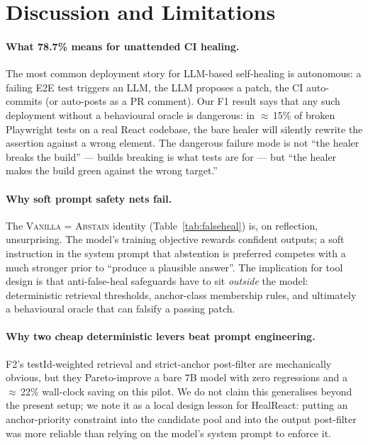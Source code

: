 \section{Discussion and Limitations}
\label{sec:discussion}

\paragraph{What 78.7\% means for unattended CI healing.}
The most common deployment story for LLM-based self-healing is autonomous: a failing E2E test triggers an LLM, the LLM proposes a patch, the CI auto-commits (or auto-posts as a PR comment). Our F1 result says that any such deployment without a behavioural oracle is dangerous: in $\approx$\,15\% of broken Playwright tests on a real React codebase, the bare healer will silently rewrite the assertion against a wrong element. The dangerous failure mode is not ``the healer breaks the build'' --- builds breaking is what tests are for --- but ``the healer makes the build green against the wrong target.''

\paragraph{Why soft prompt safety nets fail.}
The \textsc{Vanilla = Abstain} identity (Table~\ref{tab:falseheal}) is, on reflection, unsurprising. The model's training objective rewards confident outputs; a soft instruction in the system prompt that abstention is preferred competes with a much stronger prior to ``produce a plausible answer''. The implication for tool design is that anti-false-heal safeguards have to sit \emph{outside} the model: deterministic retrieval thresholds, anchor-class membership rules, and ultimately a behavioural oracle that can falsify a passing patch.

\paragraph{Why two cheap deterministic levers beat prompt engineering.}
F2's testId-weighted retrieval and strict-anchor post-filter are mechanically obvious, but they Pareto-improve a bare 7B model with zero regressions and a $\approx$\,22\% wall-clock saving on this pilot. We do not claim this generalises beyond the present setup; we note it as a local design lesson for HealReact: putting an anchor-priority constraint into the candidate pool and into the output post-filter was more reliable than relying on the model's system prompt to enforce it.

